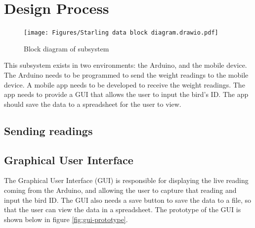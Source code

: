 \documentclass[class=report,11pt,crop=false]{standalone}
\begin{document}
			
		
	
		
	
	\section{Design Process}
		
		\begin{figure}[h!]
			\centering
			\texttt{[image: Figures/Starling data block diagram.drawio.pdf]}
			\caption{Block diagram of subsystem}
		\end{figure}
		
		This subsystem exists in two environments: the Arduino, and the mobile device. The Arduino needs to be programmed to send the weight readings to the mobile device. A mobile app needs to be developed to receive the weight readings. The app needs to provide a GUI that allows the user to input the bird's ID. The app should save the data to a spreadsheet for the user to view.
		
		\subsection{Sending readings}
		
		
		\subsection{Graphical User Interface}
		The Graphical User Interface (GUI) is responsible for displaying the live reading coming from the Arduino, and allowing the user to capture that reading and input the bird ID. The GUI also needs a save button to save the data to a file, so that the user can view the data in a spreadsheet.
		The prototype of the GUI is shown below in figure \ref{fig:gui-prototype}.
				
\end{document}
